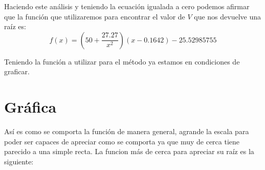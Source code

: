 \documentclass{article}
\begin{document}
Haciendo este análisis y teniendo la ecuación igualada a cero podemos afirmar que la función que utilizaremos para encontrar el valor de $V$ que nos devuelve una raíz es:
$$f(x) = (50+\frac{27.27}{x^2})(x-0.1642)-25.52985755$$


Teniendo la función a utilizar para el método ya estamos en condiciones de graficar.

\section{Gráfica}

 \begin{figure}[h]
    \centering
    
 \end{figure}

Así es como se comporta la función de manera general, agrande la escala para poder ser capaces de apreciar como se comporta ya que muy de cerca tiene parecido a una simple recta. 
La funcion más de cerca para apreciar su raíz es la siguiente:
        
\begin{figure}[h]
    \centering
\end{figure}
\end{document}
